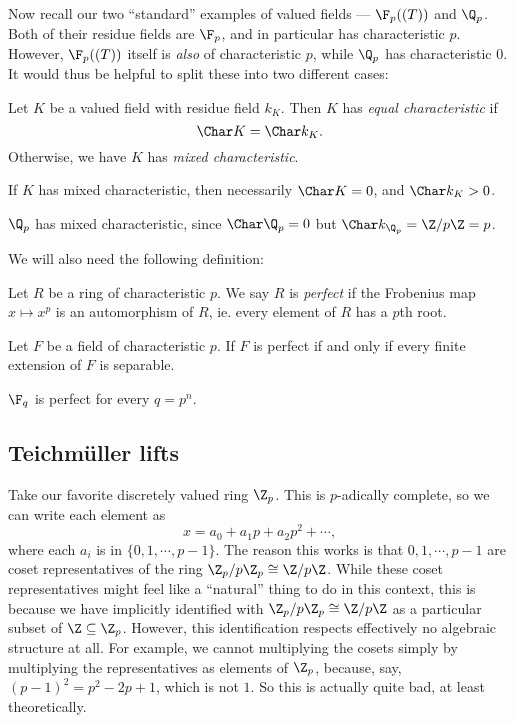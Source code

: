 \documentclass[a4paper]{article}
\begin{document}
Now recall our two ``standard'' examples of valued fields --- $\F_p((T))$ and $\Q_p$. Both of their residue fields are $\F_p$, and in particular has characteristic $p$. However, $\F_p((T))$ itself is \emph{also} of characteristic $p$, while $\Q_p$ has characteristic $0$. It would thus be helpful to split these into two different cases:

\begin{defi}
  Let $K$ be a valued field with residue field $k_K$. Then $K$ has \emph{equal characteristic} if
  \[
    \Char K = \Char k_K.
  \]
  Otherwise, we have $K$ has \emph{mixed characteristic}.
\end{defi}
If $K$ has mixed characteristic, then necessarily $\Char K = 0$, and $\Char k_K > 0$.

\begin{eg}
  $\Q_p$ has mixed characteristic, since $\Char \Q_p = 0$ but $\Char k_{\Q_p} = \Z/p\Z = p$.
\end{eg}

We will also need the following definition:
\begin{defi}
  Let $R$ be a ring of characteristic $p$. We say $R$ is \emph{perfect} if the Frobenius map $x \mapsto x^p$ is an automorphism of $R$, ie. every element of $R$ has a $p$th root.
\end{defi}

\begin{fact}
  Let $F$ be a field of characteristic $p$. If $F$ is perfect if and only if every finite extension of $F$ is separable.
\end{fact}

\begin{eg}
  $\F_q$ is perfect for every $q = p^n$.
\end{eg}

\subsection{\texorpdfstring{Teichm\"uller}{Teichmuller} lifts}
Take our favorite discretely valued ring $\Z_p$. This is $p$-adically complete, so we can write each element as
\[
  x = a_0 + a_1 p + a_2 p^2 + \cdots,
\]
where each $a_i$ is in $\{0, 1, \cdots, p - 1\}$. The reason this works is that $0, 1, \cdots, p - 1$ are coset representatives of the ring $\Z_p/p \Z_p \cong \Z/p\Z$. While these coset representatives might feel like a ``natural'' thing to do in this context, this is because we have implicitly identified with $\Z_p/p\Z_p \cong \Z/p\Z$ as a particular subset of $\Z \subseteq \Z_p$. However, this identification respects effectively no algebraic structure at all. For example, we cannot multiplying the cosets simply by multiplying the representatives as elements of $\Z_p$, because, say, $(p - 1)^2 = p^2 - 2p + 1$, which is not $1$. So this is actually quite bad, at least theoretically.
\end{document}
